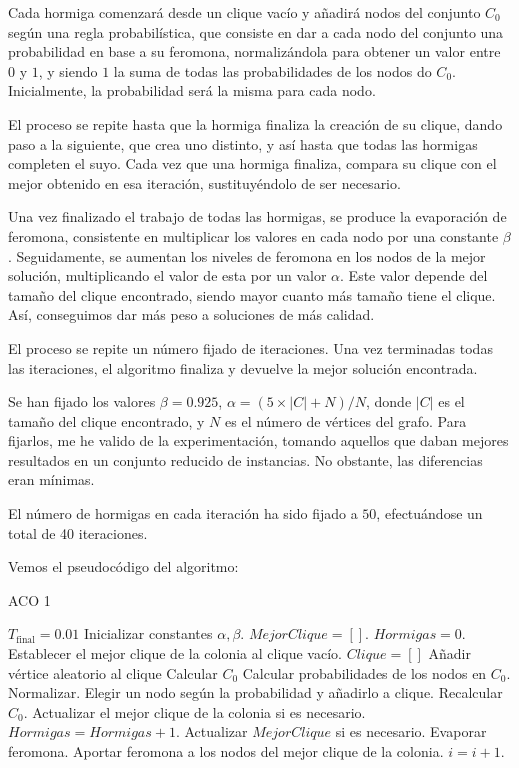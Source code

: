 Cada hormiga comenzará desde un clique vacío y añadirá nodos del conjunto $C_0$ según una regla probabilística,
que consiste en dar a cada nodo del conjunto una probabilidad en base a su feromona, normalizándola para obtener
un valor entre $0$ y $1$, y siendo $1$ la suma de todas las probabilidades de los nodos do $C_0$. Inicialmente,
la probabilidad será la misma para cada nodo.

El proceso se repite hasta que la hormiga finaliza la creación de su clique, dando paso a la siguiente, que crea
uno distinto, y así hasta que todas las hormigas completen el suyo. Cada vez que una hormiga finaliza, compara
su clique con el mejor obtenido en esa iteración, sustituyéndolo de ser necesario.

Una vez finalizado el trabajo de todas las hormigas, se produce la evaporación de feromona, consistente en
multiplicar los valores en cada nodo por una constante $\beta$. Seguidamente, se aumentan los niveles de feromona
en los nodos de la mejor solución, multiplicando el valor de esta por un valor $\alpha$. Este valor depende
del tamaño del clique encontrado, siendo mayor cuanto más tamaño tiene el clique. Así, conseguimos dar más
peso a soluciones de más calidad.

El proceso se repite un número fijado de iteraciones. Una vez terminadas todas las iteraciones, el algoritmo
finaliza y devuelve la mejor solución encontrada.

Se han fijado los valores $\beta = 0.925$, $\alpha = (5 \times |C| + N) / N$, donde $|C|$ es el tamaño del clique
encontrado, y $N$ es el número de vértices del grafo. Para fijarlos, me he valido de la experimentación,
tomando aquellos que daban mejores resultados en un conjunto reducido de instancias. No obstante, las diferencias
eran mínimas.

El número de hormigas en cada iteración ha sido fijado a $50$, efectuándose un total de 40 iteraciones.

Vemos el pseudocódigo del algoritmo:

\begin{algorithm}[H]
\caption{ACO 1}
  \begin{algorithmic}
    \State $T_{\text{final}} = 0.01$
    \State Inicializar constantes $\alpha, \beta$.
    \State $Mejor Clique = []$.
    \Repeat
    \State $Hormigas = 0$.
      \State Establecer el mejor clique de la colonia al clique vacío.
      \Repeat
        \State $Clique = []$
        \State Añadir vértice aleatorio al clique
        \State Calcular $C_0$
        \Repeat
          \State Calcular probabilidades de los nodos en $C_0$. Normalizar.
          \State Elegir un nodo según la probabilidad y añadirlo a clique.
          \State Recalcular $C_0$.
        \State Actualizar el mejor clique de la colonia si es necesario.
        \State $Hormigas = Hormigas + 1$.
      \State Actualizar $Mejor Clique$ si es necesario.
      \State Evaporar feromona.
      \State Aportar feromona a los nodos del mejor clique de la colonia.
      \State $i = i+1$.
  \end{algorithmic}
\end{algorithm}



